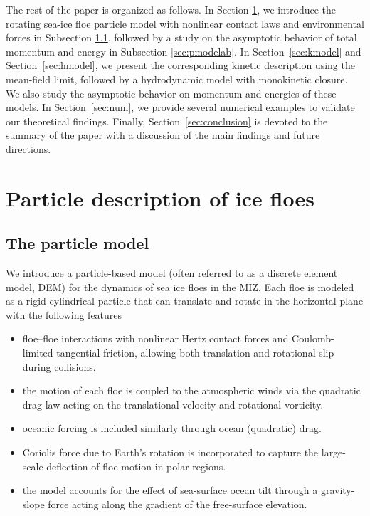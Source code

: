 \documentclass[a4paper,11pt]{article}
\numberwithin{equation}{section}
\theoremstyle{definition}
\begin{document}
\color{black}

The rest of the paper is organized as follows.  
In Section \ref{sec:pmodel}, we introduce the rotating sea-ice floe particle model with nonlinear contact laws and environmental forces in Subsection \ref{sec:dem}, followed by a study on the asymptotic behavior of total momentum and energy in Subsection \ref{sec:pmodelab}. 
In Section~\ref{sec:kmodel} and Section~\ref{sec:hmodel}, we present the corresponding kinetic description using the mean-field limit, followed by a hydrodynamic model with monokinetic closure. 
We also study the asymptotic behavior on momentum and energies of these models. 
In Section~\ref{sec:num}, we provide several numerical examples to validate our theoretical findings.
Finally, Section~\ref{sec:conclusion} is devoted to the summary of the paper with a discussion of the main findings and future directions.


\section{Particle description of ice floes} \label{sec:pmodel}


\subsection{The particle model} \label{sec:dem}

We introduce a particle-based model (often referred to as a discrete element model, DEM) for the dynamics of sea ice floes in the MIZ. 
Each floe is modeled as a rigid cylindrical particle that can translate and rotate in the horizontal plane with the following features


\begin{itemize}
    \item floe--floe interactions with nonlinear Hertz contact forces and Coulomb-limited tangential friction, allowing both translation and rotational slip during collisions. 
    
    \item the motion of each floe is coupled to the atmospheric winds via the quadratic drag law acting on the translational velocity and rotational vorticity. 
    
    \item oceanic forcing is included similarly through ocean (quadratic) drag. 
    
    \item Coriolis force due to Earth's rotation is incorporated to capture the large-scale deflection of floe motion in polar regions. 
    
    \item the model accounts for the effect of sea-surface ocean tilt through a gravity-slope force acting along the gradient of the free-surface elevation. 

\end{itemize}
\end{document}
